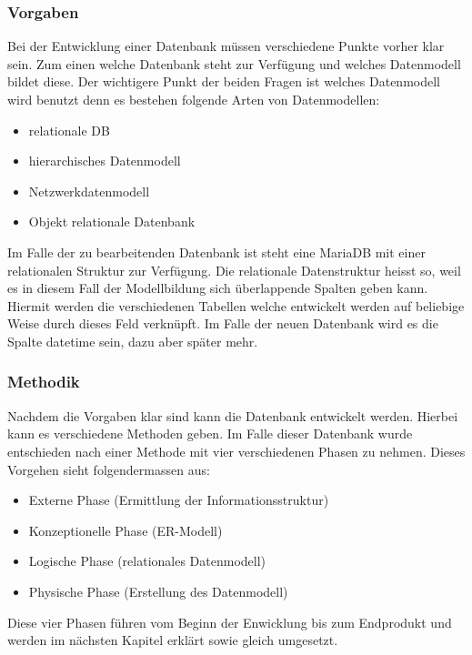 \subsubsection{Vorgaben}
Bei der Entwicklung einer Datenbank müssen verschiedene Punkte vorher klar sein. Zum einen welche Datenbank steht zur Verfügung und welches Datenmodell bildet diese. Der wichtigere Punkt der beiden Fragen ist welches Datenmodell wird benutzt denn es bestehen folgende Arten von Datenmodellen:
\begin{itemize}
\item relationale DB
\item hierarchisches Datenmodell
\item Netzwerkdatenmodell
\item Objekt relationale Datenbank
\end{itemize}

Im Falle der zu bearbeitenden Datenbank ist steht eine MariaDB mit einer relationalen Struktur zur Verfügung. Die relationale Datenstruktur heisst so, weil es in diesem Fall der Modellbildung sich überlappende Spalten geben kann.\cite{IntroductionToRelationalDatabases:MariaDB} Hiermit werden die verschiedenen Tabellen welche entwickelt werden auf beliebige Weise durch dieses Feld verknüpft. Im Falle der neuen Datenbank wird es die Spalte datetime sein, dazu aber später mehr.\\

\subsubsection{Methodik}
Nachdem die Vorgaben klar sind kann die Datenbank entwickelt werden. Hierbei kann es verschiedene Methoden geben. Im Falle dieser Datenbank wurde entschieden nach einer Methode mit vier verschiedenen Phasen zu nehmen. \cite{Datenbanken:GrundlagenUndEntwurf:VeikkoKrypczyk} Dieses Vorgehen sieht folgendermassen aus:
\begin{itemize}
\item Externe Phase (Ermittlung der Informationsstruktur)
\item Konzeptionelle Phase (ER-Modell)
\item Logische Phase (relationales Datenmodell)
\item Physische Phase (Erstellung des Datenmodell)
\end{itemize}

Diese vier Phasen führen vom Beginn der Enwicklung bis zum Endprodukt und werden im nächsten Kapitel erklärt sowie gleich umgesetzt.
